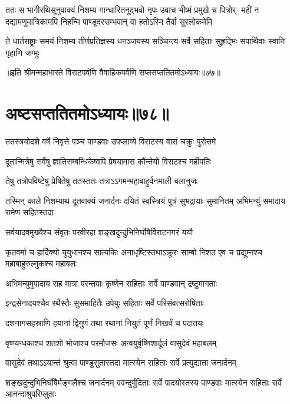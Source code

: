 \sixlineindentedshloka
{ततः स भागीरथिसूनुवाक्यं}
{निशम्य गान्धारितनूद्भवो नृपः}
{उवाच भीष्मं प्रमुखे च पित्रोर्-}
{महीं न दद्यामणुमात्रिकामपि}
{निहन्मि पाण्डूदरसम्भवान् वा}
{हतोऽस्मि तैर्वा सुरलोकमेमि}


\fourlineindentedshloka
{ते धार्तराष्ट्राः समयं निशम्य}
{तीर्णप्रतिज्ञस्य धनञ्जयस्य}
{सञ्चिन्त्य सर्वे सहिताः सुहृद्भिः}
{सपार्थिवाः स्वानि गृहाणि जग्मुः}

॥इति श्रीमन्महाभारते विराटपर्वणि वैवाहिकपर्वणि सप्तसप्ततितमोऽध्यायः॥७७॥

\chapter{अष्टसप्ततितमोऽध्यायः॥७८॥}

\twolineshloka
{ततस्त्रयोदशे वर्षे निवृत्ते पञ्च पाण्डवाः}
{उपप्लाव्ये विराटस्य वासं चक्रुः पुरोत्तमे}


\twolineshloka
{दूतान्मित्रेषु सर्वेषु ज्ञातिसम्बन्धिकेष्वपि}
{प्रेषयामास कौन्तेयो विराटश्च महीपतिः}


\twolineshloka
{तेषु तत्रोपविष्टेषु प्रेषितेषु ततस्ततः}
{तत्राऽऽगमन्महाबाहुर्वनमाली बलानुजः}


\threelineshloka
{तस्मिन् काले निशम्याथ दूतवाक्यं जनार्दनः}
{दयितं स्वस्त्रियं पुत्रं सुभद्रायाः सुमानितम्}
{अभिमन्युं समादाय रामेण सहितस्तदा}


\twolineshloka
{सर्वयादवमुख्यैश्च संवृतः परवीरहा}
{शङ्खदुन्दुभिनिर्घोषैर्विराटनगरं ययौ}


\threelineshloka
{कृतवर्मा च हार्दिक्यो युयुधानश्च सात्यकिः}
{अनाधृष्टिस्तथाऽक्रूरः साम्बो निशठ एव च}
{प्रद्युम्नश्च महाबाहुरुल्मुकश्च महाबलः}


\twolineshloka
{अभिमन्युमुपादाय सह मात्रा परन्तपाः}
{कृष्णेन सहिताः सर्वे पाण्डवान् द्रष्टुमागताः}


\twolineshloka
{इन्द्रसेनादयश्चैव रथैस्तैः सुसमाहितैः}
{उपेयुः सहिताः सर्वे परिसंवत्सरोषिताः}


\twolineshloka
{दशनागसहस्राणि हयानां द्विगुणं तथा}
{रथानां नियुतं पूर्णं निखर्वं च पदातयः}


\twolineshloka
{वृष्ण्यन्धकाश्च शतशो भोजाश्च परमौजसः}
{अन्वयुर्वृष्णिशार्दूलं वासुदेवं महाबलम्}


\twolineshloka
{वासुदेवं तथाऽऽयान्तं श्रुत्वा पाण्डुसुतास्तदा}
{मात्स्येन सहिताः सर्वे प्रत्युद्याता जनार्दनम्}


\threelineshloka
{शङ्खदुन्दुभिनिर्घोषैर्मङ्गलैश्च जनार्दनम्}
{ववन्दुर्मुदिताः सर्वे पादयोस्तस्य पाण्डवाः}
{मात्स्येन सहिताः सर्वे आनन्दाश्रुपरिप्लुताः}

